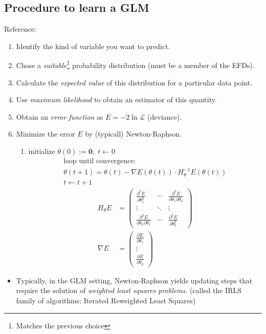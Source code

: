 \subsection{Procedure to learn a GLM}

Reference: 

\newcommand{\dcheckmark}{\checkmark~\hspace{-0.9em}\checkmark}

\begin{enumerate}
  \item Identify the kind of variable you want to predict. \checkmark
  \item Chose a \emph{suitable}\footnote{Matches the previous choice} probability distribution (must be a member of the EFDs). \dcheckmark
  \item Calculate the \emph{expected value} of this distribution for a particular
    data point. \dcheckmark
  \item Use \emph{maximum likelihood} to obtain an estimator of this quantity.
  \item Obtain an \emph{error function} as $E = -2\ln \mathcal{L}$ (deviance).
  \item Minimize the error $E$ by (typicall) Newton-Raphson.
    \begin{enumerate}
      \item initialize $\theta (0) := \boldsymbol 0, \; t \gets 0$
        \begin{align*}
          \text{loop until convergence:} \\
          \theta (t+1) = \theta(t) - \nabla E(\theta(t)) \cdot H_\theta^{-1} E(\theta(t)) \\
          t \gets t + 1
        \end{align*}
        \begin{align*}
          H_\theta E &= \begin{pmatrix}
            \frac{\partial^2 E}{\partial \theta_1^2} & \cdots & \frac{\partial^2 E}{\partial \theta_1 \partial \theta_k} \\
            \vdots & \ddots & \vdots \\
            \frac{\partial^2 E}{\partial \theta_k \partial \theta_1} & \cdots & \frac{\partial^2 E}{\partial \theta_k^2}
          \end{pmatrix} \\
          \nabla E &= \begin{pmatrix}
            \frac{\partial E}{\partial \theta_1} \\
            \vdots \\
            \frac{\partial E}{\partial \theta_k}
          \end{pmatrix}
        \end{align*}
    \end{enumerate}
\end{enumerate}

\begin{itemize}
  \item Typically, in the GLM setting, Newton-Raphson yields updating
    steps that require the solution of \emph{weighted least squares problems}.
    (called the IRLS family of algorithms: Iterated Reweighted Least Squares)
\end{itemize}

